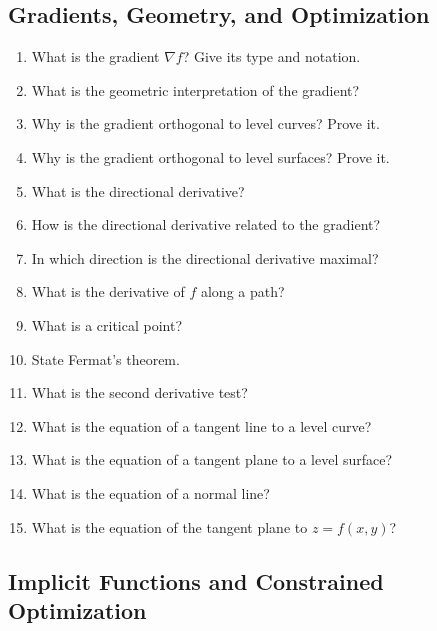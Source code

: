 \subsection{Gradients, Geometry, and Optimization}

\begin{enumerate}

\item What is the gradient $\nabla f$? Give its type and notation.

\item What is the geometric interpretation of the gradient?

\item Why is the gradient orthogonal to level curves? Prove it.

\item Why is the gradient orthogonal to level surfaces? Prove it.

\item What is the directional derivative?

\item How is the directional derivative related to the gradient?

\item In which direction is the directional derivative maximal?

\item What is the derivative of $f$ along a path?

\item What is a critical point?

\item State Fermat's theorem.

\item What is the second derivative test?

\item What is the equation of a tangent line to a level curve?

\item What is the equation of a tangent plane to a level surface?

\item What is the equation of a normal line?

\item What is the equation of the tangent plane to $z=f(x,y)$?

\end{enumerate}

\subsection{Implicit Functions and Constrained Optimization}

